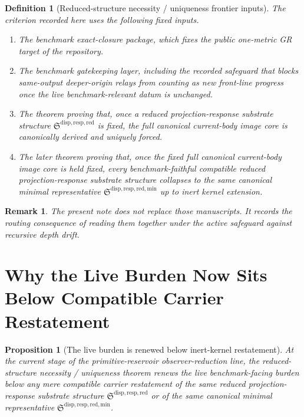 \documentclass[11pt]{article}
\newcommand{\ReducedStructure}{\mathfrak S^{\mathrm{disp,resp,red}}}
\newcommand{\MinimalReducedStructure}{\mathfrak S^{\mathrm{disp,resp,red,min}}}
\newtheorem{definition}{Definition}
\newtheorem{proposition}{Proposition}
\newtheorem{remark}{Remark}
\begin{document}
\begin{definition}[Reduced-structure necessity / uniqueness frontier inputs]
The criterion recorded here uses the following fixed inputs.
\begin{enumerate}
    \item The benchmark exact-closure package, which fixes the public one-metric GR target of the repository.
    \item The benchmark gatekeeping layer, including the recorded safeguard that blocks same-output deeper-origin relays from counting as new front-line progress once the live benchmark-relevant datum is unchanged.
    \item The theorem proving that, once a reduced projection-response substrate structure \(\ReducedStructure\) is fixed, the full canonical current-body image core is canonically derived and uniquely forced.
    \item The later theorem proving that, once the fixed full canonical current-body image core is held fixed, every benchmark-faithful compatible reduced projection-response substrate structure collapses to the same canonical minimal representative \(\MinimalReducedStructure\) up to inert kernel extension.
\end{enumerate}
\end{definition}

\begin{remark}
The present note does not replace those manuscripts. It records the routing consequence of reading them together under the active safeguard against recursive depth drift.
\end{remark}

\section{Why the Live Burden Now Sits Below Compatible Carrier Restatement}

\begin{proposition}[The live burden is renewed below inert-kernel restatement]
At the current stage of the primitive-reservoir observer-reduction line, the reduced-structure necessity / uniqueness theorem renews the live benchmark-facing burden below any mere compatible carrier restatement of the same reduced projection-response substrate structure \(\ReducedStructure\) or of the same canonical minimal representative \(\MinimalReducedStructure\).
\end{proposition}
\end{document}
